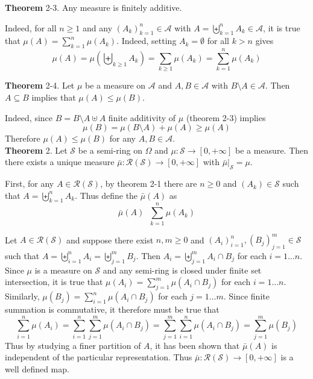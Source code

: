 \documentclass[a4paper]{article}
\newcommand{\clo}[1]{\left [ #1 \right ]}
\newcommand{\brac}[1]{\left ( #1 \right )}
\newcommand{\induc}[1]{\left . #1 \right \vert}
\newcommand{\Zinf}{\clo{ 0, +\infty }}
\newcommand{\Scal}{\mathcal{S}}
\newcommand{\Ring}[1]{\mathcal{R}\brac{#1}}
\newcommand{\defn}{\mathop{\overset{\Delta}{=}}\nolimits}
\begin{document}
\label{thm:meas_fintely_additive} \noindent \textbf{Theorem} 2-3.
Any measure is finitely additive.

Indeed, for all $n\geq 1$ and any $\brac{A_k}_{k=1}^n\in \mathcal{A}$ with $A = \biguplus_{k=1}^n A_k \in \mathcal{A}$, it is true that $\mu\brac{A} = \sum_{k=1}^n \mu\brac{A_k}$. Indeed, setting $A_k=\emptyset$ for all $k>n$ gives \[\mu\brac{A} = \mu\brac{\biguplus_{k\geq 1} A_k} = \sum_{k\geq1}\mu\brac{A_k} = \sum_{k=1}^n \mu\brac{A_k}\]

\label{thm:meas_set_inclusison} \noindent \textbf{Theorem} 2-4.
Let $\mu$ be a measure on $\mathcal{A}$ and $A,B\in \mathcal{A}$ with $B\setminus A\in \mathcal{A}$. Then $A\subseteq B$ implies that $\mu\brac{A}\leq \mu\brac{B}$.

Indeed, since $B=B\setminus A \uplus A$ finite additivity of $\mu$ (theorem 2-3) implies \[\mu\brac{B} = \mu\brac{B\setminus A}+\mu\brac{A}\geq \mu\brac{A}\] Therefore $\mu\brac{A}\leq\mu\brac{B}$ for any $A, B\in \mathcal{A}$.\\

\label{thm:extension1} \noindent \textbf{Theorem} 2.
Let $\Scal$ be a semi-ring on $\Omega$ and $\mu:\Scal\to\Zinf$ be a measure. Then there exists a unique measure $\bar{\mu}:\Ring{\Scal}\to\Zinf$ with $\induc{\bar{\mu}}_{\Scal}=\mu$.

First, for any $A\in \Ring{\Scal}$, by theorem 2-1 there are $n\geq0$ and $\brac{A_k}\in \Scal$ such that $A=\biguplus_{k=1}^n A_k$. Thus define the $\bar{\mu}\brac{A}$ as \[\bar{\mu}\brac{A}\defn \sum_{k=1}^n \mu\brac{A_k}\]

Let $A\in \Ring{\Scal}$ and suppose there exist $n,m\geq 0$ and $\brac{A_i}_{i=1}^n, \brac{B_j}_{j=1}^m\in \Scal$ such that $A = \biguplus_{i=1}^n A_i = \biguplus_{j=1}^m B_j$. Then $A_i = \biguplus_{j=1}^m A_i\cap B_j$ for each $i=1\ldots n$. Since $\mu$ is a measure on $\Scal$ and any semi-ring is closed under finite set intersection, it is true that $\mu\brac{A_i}=\sum_{j=1}^m \mu\brac{A_i\cap B_j}$ for each $i=1\ldots n$. Similarly, $\mu\brac{B_j}=\sum_{i=1}^n \mu\brac{A_i\cap B_j}$ for each $j=1\ldots m$. Since finite summation is commutative, it therefore must be true that \[\sum_{i=1}^n \mu\brac{A_i} = \sum_{i=1}^n \sum_{j=1}^m \mu\brac{A_i\cap B_j} = \sum_{j=1}^m \sum_{i=1}^n \mu\brac{A_i\cap B_j} = \sum_{j=1}^m\mu\brac{B_j}\] Thus by studying a finer partition of $A$, it has been shown that $\bar{\mu}\brac{A}$ is independent of the particular representation. Thus $\bar{\mu}:\Ring{\Scal}\to\Zinf$ is a well defined map.
\end{document}

